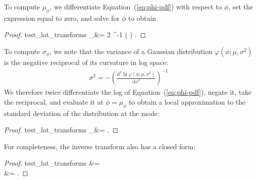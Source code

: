 \documentclass[modern]{aastex62}
\begin{document}
To compute $\mu_\phi$, we differentiate Equation~(\ref{eq:phi-pdf}) with respect
to $\phi$, set the expression equal to zero, and solve
for $\phi$ to obtain
%
\begin{proof}{test_lat_transforms}
    \label{eq:muphi}
    \mu_\phi &= 2 \tan^{-1}
    \left(
    \right)
    \quad.
\end{proof}
%
To compute $\sigma_\phi$, we note that the variance of a Gaussian distribution
$\varphi(\phi; \mu, \sigma^2)$
is the negative reciprocal of its curvature in log space:
%
\begin{align}
    \sigma^2 = -\left(\frac{\mathrm{d}^2 \ln \varphi(\phi; \mu, \sigma^2)}{\mathrm{d}\phi^2}\right)^{-1}
\end{align}
%
We therefore twice differentiate the log of Equation~(\ref{eq:phi-pdf}), negate it,
take the reciprocal, and evaluate it at $\phi = \mu_\phi$ to obtain a local
approximation to the standard deviation of the distribution at the mode:
%
\begin{proof}{test_lat_transforms}
    \label{eq:sigmaphi}
    \sigma_\phi &= 
    \quad.
\end{proof}
%
For completeness, the inverse transform also has a closed form:
%
\begin{proof}{test_lat_transforms}
    \alpha &=  \\
    \beta &= 
    \quad.
\end{proof}
\end{document}
